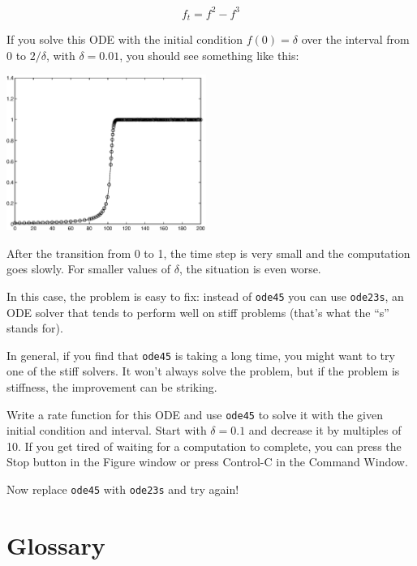 \[ f_t = f^2 - f^3 \]

If you solve this ODE with the initial condition $f(0) = \delta$ over
the interval from 0 to $2/\delta$, with $\delta = 0.01$, you should
see something like this:

\beforefig \centerline{\includegraphics[height=2in]{figs/stiff.eps}}

After the transition from 0 to 1, the time step is very small and the
computation goes slowly. For smaller values of $\delta$, the
situation is even worse.

In this case, the problem is easy to fix: instead of {\tt ode45} you can
use {\tt ode23s}, an ODE solver that tends to perform well on stiff
problems (that's what the ``s'' stands for).

In general, if you find that {\tt ode45} is taking a long time, you
might want to try one of the stiff solvers. It won't always solve
the problem, but if the problem is stiffness, the improvement can
be striking.

\begin{ex}
Write a rate function for this ODE and use
{\tt ode45} to solve it with the given initial condition and interval.
Start with $\delta = 0.1$ and decrease it by multiples of 10. If
you get tired of waiting for a computation to complete, you can 
press the Stop button in the Figure window or press Control-C in
the Command Window.

Now replace {\tt ode45} with {\tt ode23s} and try again!
\end{ex}



\section{Glossary}

